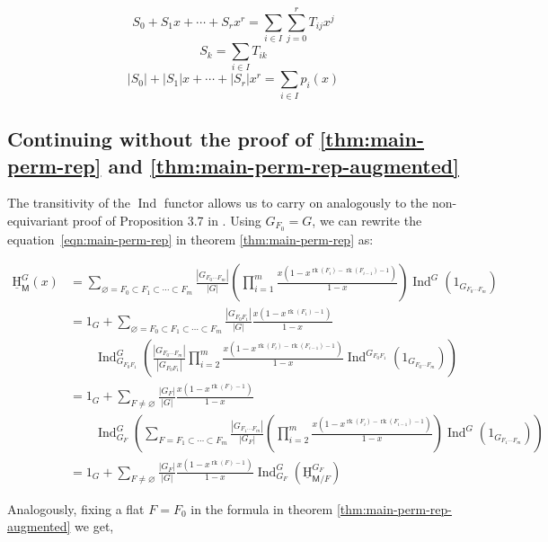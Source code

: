 \documentclass[11pt, a4paper, english]{amsart}
\theoremstyle{teoremas}
\theoremstyle{definition}
\DeclareMathOperator{\rk}{rk}
\newcommand{\M}{\mathsf{M}}
\newcommand{\uH}{\underline{\mathrm{H}}}
\newcommand{\Ind}{\operatorname{Ind}}
\begin{document}
$$S_0+S_1x+\cdots+S_rx^r = \sum_{i\in I}{\sum_{j=0}^{r}{T_{ij}x^j}}$$
$$S_k = \sum_{i\in I}{T_{ik}}$$
$$|S_0|+|S_1|x+\cdots+|S_r|x^r =\sum_{i\in I}{p_i(x)}$$

\subsection{Continuing without the proof of \ref{thm:main-perm-rep} and
\ref{thm:main-perm-rep-augmented}}

The transitivity of the $\Ind$ functor allows us to carry on analogously to
the non-equivariant proof of Proposition 3.7 in \cite{fmsv24}. Using $G_{F_0}=G$, we can rewrite the equation~\ref{eqn:main-perm-rep} in theorem \ref{thm:main-perm-rep} as:

\begin{align*}
    \uH_{\M}^G(x) &= \sum_{\varnothing = F_0\subset F_1\subset\cdots\subset F_m}\frac{|G_{F_0\cdots F_m}|}{|G|}
        \left(\prod_{i=1}^{m}{\frac{x(1-x^{\rk(F_i)-\rk(F_{i-1})-1})}{1-x}}\right)
        \Ind^G\left(1_{G_{F_0\cdots F_m}}\right)\\
        &= 1_G +
        \sum_{\varnothing = F_0\subset F_1\subset\cdots\subset F_m}\frac{|G_{F_0F_1}|}{|G|}
        \frac{x(1-x^{\rk(F_1)-1})}{1-x}\\
        &\qquad\Ind^G_{G_{F_0F_1}}\left(
        \frac{|G_{F_0\cdots F_m}|}{|G_{F_0F_1}|}
        \prod_{i=2}^{m}{\frac{x(1-x^{\rk(F_i)-\rk(F_{i-1})-1})}{1-x}}
        \Ind^{G_{F_0F_1}}\left(1_{G_{F_0\cdots F_m}}\right)
        \right)\\
        &= 1_G +
        \sum_{F\neq \varnothing}
        \frac{|G_{F}|}{|G|}\frac{x(1-x^{\rk(F)-1})}{1-x}\\
        &\qquad\Ind^G_{G_{F}}\left(
        \sum_{F = F_1\subset\cdots\subset F_m}
        \frac{|G_{F_1\cdots F_m}|}{|G_F|}
        \left(\prod_{i=2}^{m}{\frac{x(1-x^{\rk(F_i)-\rk(F_{i-1})-1})}{1-x}}\right)
        \Ind^{G}\left(1_{G_{F_1\cdots F_m}}\right)
        \right)\\
        &= 1_G +
        \sum_{F\neq \varnothing}
        \frac{|G_{F}|}{|G|}\frac{x(1-x^{\rk(F)-1})}{1-x}\Ind^G_{G_F}
        \left(\uH_{\M/F}^{G_F}\right)
\end{align*}

Analogously, fixing a flat $F=F_0$ in the formula in theorem \ref{thm:main-perm-rep-augmented}
we get,
\end{document}
